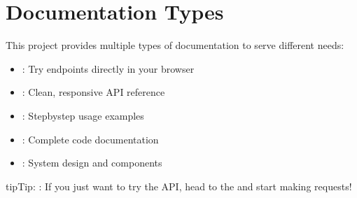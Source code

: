 \documentclass[letterpaper,10pt,english]{sphinxmanual}
\begin{document}
\chapter{Documentation Types}
\label{\detokenize{index:documentation-types}}
\sphinxAtStartPar
This project provides multiple types of documentation to serve different needs:
\begin{description}
\begin{itemize}
\item {} 
\sphinxAtStartPar
{}:  \sphinxhyphen{} Try endpoints directly in your browser

\end{itemize}
\begin{itemize}
\item {} 
\sphinxAtStartPar
{}:  \sphinxhyphen{} Clean, responsive API reference

\item {} 
\sphinxAtStartPar
{}: {\hyperref[\detokenize{user_guide::doc}]{}} \sphinxhyphen{} Step\sphinxhyphen{}by\sphinxhyphen{}step usage examples

\end{itemize}

\begin{itemize}
\item {} 
\sphinxAtStartPar
{}: {\hyperref[\detokenize{api_reference::doc}]{}} \sphinxhyphen{} Complete code documentation

\item {} 
\sphinxAtStartPar
{}: {\hyperref[\detokenize{architecture::doc}]{}} \sphinxhyphen{} System design and components

\end{itemize}

\end{description}

\begin{sphinxadmonition}{tip}{Tip:}
\sphinxAtStartPar
{}: If you just want to try the API, head to the  and start making requests!
\end{sphinxadmonition}
\end{document}
